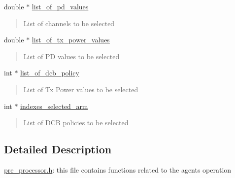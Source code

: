 \begin{DoxyCompactItemize}
\mbox{\label{classPreProcessor_a2ecbea9deb3fc158eb2c6295be7e7d02}} 
double $\ast$ \hyperlink{classPreProcessor_a2ecbea9deb3fc158eb2c6295be7e7d02}{list\+\_\+of\+\_\+pd\+\_\+values}
\begin{DoxyCompactList}\small\item\em \begin{quote}
List of channels to be selected \end{quote}
\end{DoxyCompactList}\item 
\mbox{\label{classPreProcessor_a259cff86416840f4517084c7806c4faa}} 
double $\ast$ \hyperlink{classPreProcessor_a259cff86416840f4517084c7806c4faa}{list\+\_\+of\+\_\+tx\+\_\+power\+\_\+values}
\begin{DoxyCompactList}\small\item\em \begin{quote}
List of PD values to be selected \end{quote}
\end{DoxyCompactList}\item 
\mbox{\label{classPreProcessor_a6981d3b83b6d8173e305cb409108921e}} 
int $\ast$ \hyperlink{classPreProcessor_a6981d3b83b6d8173e305cb409108921e}{list\+\_\+of\+\_\+dcb\+\_\+policy}
\begin{DoxyCompactList}\small\item\em \begin{quote}
List of Tx Power values to be selected \end{quote}
\end{DoxyCompactList}\item 
\mbox{\label{classPreProcessor_a1976003ebd08bbee7836fe0bbe2d7be9}} 
int $\ast$ \hyperlink{classPreProcessor_a1976003ebd08bbee7836fe0bbe2d7be9}{indexes\+\_\+selected\+\_\+arm}
\begin{DoxyCompactList}\small\item\em \begin{quote}
List of D\+CB policies to be selected \end{quote}
\end{DoxyCompactList}\end{DoxyCompactItemize}


\subsection{Detailed Description}
\hyperlink{pre__processor_8h_source}{pre\+\_\+processor.\+h}\+: this file contains functions related to the agents\textquotesingle{} operation


